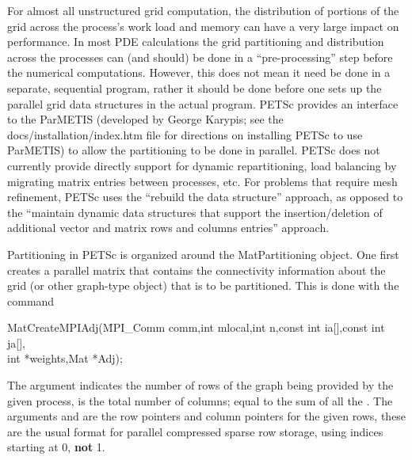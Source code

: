 For almost all unstructured grid computation, the distribution of portions of
the grid across the process's work load and memory can have a very large
impact on performance. In most PDE calculations the grid partitioning and
distribution across the processes can (and should) be done in a ``pre-processing'' step
before the numerical computations. However, this does not mean it need be done
in a separate, sequential program, rather it should be done before one sets up the
parallel grid data structures in the actual program. PETSc provides an interface to
the ParMETIS (developed by George Karypis; see the docs/installation/index.htm file
for directions on installing PETSc to use ParMETIS) to allow the partitioning to be done in
parallel. PETSc does not currently provide directly support for dynamic
repartitioning, load balancing by migrating matrix entries between processes, etc.
For problems that require mesh refinement, PETSc uses the ``rebuild the data structure''
approach, as opposed to the ``maintain dynamic data structures that support the
insertion/deletion of additional vector and matrix rows and columns entries'' approach.

Partitioning in PETSc is organized around the MatPartitioning object.
One first creates a parallel matrix that contains the connectivity information about the
grid (or other graph-type object) that is to be partitioned. This is done with the
command
\begin{tabbing}
 MatCreateMPIAdj(\=MPI\_Comm comm,int mlocal,int n,const int ia[],const int ja[],\\
                 \>        int *weights,Mat *Adj);
\end{tabbing}
The argument  indicates the number of rows of the graph being provided
by the given process,  is the total number of columns; equal to the
sum of all the . The arguments  and  are the row pointers
and column pointers for the given rows, these are the usual format for parallel
compressed sparse row storage, using indices starting at 0, {\bf not} 1.

